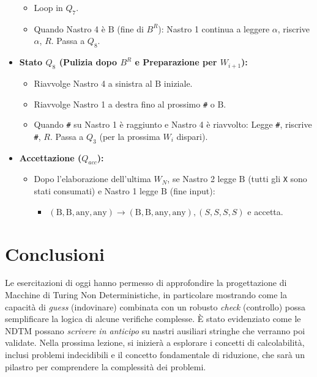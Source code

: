 \documentclass[a4paper]{article}
\newcommand{\B}{\text{B}} %
\begin{document}
\begin{itemize}
\begin{itemize}
            \item Loop in $Q_7$.
            \item Quando Nastro 4 è $\B$ (fine di $B^R$): Nastro 1 continua a leggere $\alpha$, riscrive $\alpha$, $R$. Passa a $Q_8$.
        \end{itemize}
    \item \textbf{Stato $Q_8$ (Pulizia dopo $B^R$ e Preparazione per $W_{i+1}$):}
        \begin{itemize}
            \item Riavvolge Nastro 4 a sinistra al $\B$ iniziale.
            \item Riavvolge Nastro 1 a destra fino al prossimo \texttt{\#} o $\B$.
            \item Quando \texttt{\#} su Nastro 1 è raggiunto e Nastro 4 è riavvolto: Legge \texttt{\#}, riscrive \texttt{\#}, $R$. Passa a $Q_3$ (per la prossima $W_i$ dispari).
        \end{itemize}
    \item \textbf{Accettazione ($Q_{acc}$):}
        \begin{itemize}
            \item Dopo l'elaborazione dell'ultima $W_N$, se Nastro 2 legge $\B$ (tutti gli \texttt{X} sono stati consumati) e Nastro 1 legge $\B$ (fine input):
                \begin{itemize}
                    \item $(\B, \B, \text{any}, \text{any}) \to (\B, \B, \text{any}, \text{any}), (S,S,S,S)$ e accetta.
                \end{itemize}
        \end{itemize}
\end{itemize}

\section{Conclusioni}
Le esercitazioni di oggi hanno permesso di approfondire la progettazione di Macchine di Turing Non Deterministiche, in particolare mostrando come la capacità di \textit{guess} (indovinare) combinata con un robusto \textit{check} (controllo) possa semplificare la logica di alcune verifiche complesse. È stato evidenziato come le NDTM possano \textit{scrivere in anticipo} su nastri ausiliari stringhe che verranno poi validate.
Nella prossima lezione, si inizierà a esplorare i concetti di calcolabilità, inclusi problemi indecidibili e il concetto fondamentale di riduzione, che sarà un pilastro per comprendere la complessità dei problemi.
\end{document}
